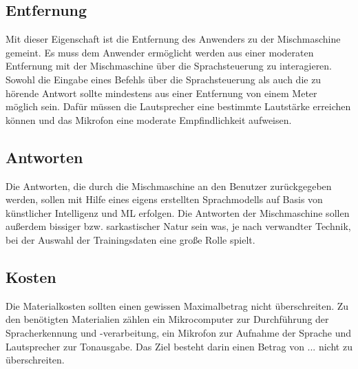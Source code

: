 \subsection{Entfernung}
Mit dieser Eigenschaft ist die Entfernung des Anwenders zu der Mischmaschine gemeint. Es muss dem Anwender ermöglicht werden aus einer moderaten Entfernung mit der Mischmaschine über die Sprachsteuerung zu interagieren. Sowohl die Eingabe eines Befehls über die Sprachsteuerung als auch die zu hörende Antwort sollte mindestens aus einer Entfernung von einem Meter möglich sein. Dafür müssen die Lautsprecher eine bestimmte Lautstärke erreichen können und das Mikrofon eine moderate Empfindlichkeit aufweisen.
\subsection{Antworten}
Die Antworten, die durch die Mischmaschine an den Benutzer zurückgegeben werden, sollen mit Hilfe eines eigens erstellten Sprachmodells auf Basis von künstlicher Intelligenz und \ac{ML} erfolgen. Die Antworten der Mischmaschine sollen außerdem bissiger bzw. sarkastischer Natur sein was, je nach verwandter Technik, bei der Auswahl der Trainingsdaten eine große Rolle spielt.  
\subsection{Kosten}
Die Materialkosten sollten einen gewissen Maximalbetrag nicht überschreiten. Zu den benötigten Materialien zählen ein Mikrocomputer zur Durchführung der Spracherkennung und -verarbeitung, ein Mikrofon zur Aufnahme der Sprache und Lautsprecher zur Tonausgabe. Das Ziel besteht darin einen Betrag von ... nicht zu überschreiten.
